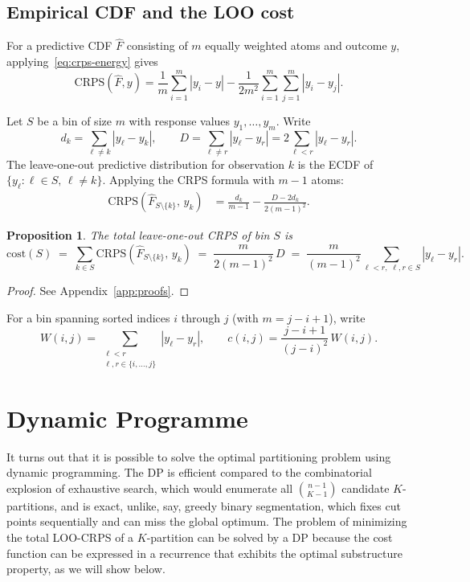 \documentclass[11pt]{article}
\newtheorem{proposition}{Proposition}
\begin{document}
\subsection*{Empirical CDF and the LOO cost}

For a predictive CDF $\hat{F}$ consisting of $m$ equally weighted atoms and outcome $y$,
applying~\eqref{eq:crps-energy} gives
\[
  \mathrm{CRPS}(\hat{F}, y)
  = \frac{1}{m}\sum_{i=1}^m |y_i - y|
    - \frac{1}{2m^2}\sum_{i=1}^m\sum_{j=1}^m |y_i - y_j|.
\]

Let $S$ be a bin of size $m$ with response values $y_1, \ldots, y_m$.
Write
\[
  d_k = \sum_{\ell \ne k} |y_\ell - y_k|,
  \qquad
  D = \sum_{\ell \ne r} |y_\ell - y_r| = 2\sum_{\ell < r}|y_\ell - y_r|.
\]
The leave-one-out predictive distribution for observation $k$ is the ECDF of
$\{y_\ell : \ell \in S,\, \ell \ne k\}$.
Applying the CRPS formula with $m - 1$ atoms:
\begin{align*}
  \mathrm{CRPS}(\hat{F}_{S\setminus\{k\}},\, y_k)
  &= \frac{d_k}{m-1}
     - \frac{D - 2d_k}{2(m-1)^2}.
\end{align*}

\begin{proposition}
\label{prop:cost}
The total leave-one-out CRPS of bin $S$ is
\[
  \mathrm{cost}(S)
  \;=\; \sum_{k \in S}\mathrm{CRPS}(\hat{F}_{S\setminus\{k\}},\, y_k)
  \;=\; \frac{m}{2(m-1)^2}\, D
  \;=\; \frac{m}{(m-1)^2} \sum_{\ell < r,\; \ell,r\in S} |y_\ell - y_r|.
\]
\end{proposition}

\begin{proof}
See Appendix~\ref{app:proofs}.
\end{proof}

For a bin spanning sorted indices $i$ through $j$ (with $m = j - i + 1$), write
\[
  W(i,j) = \sum_{\substack{\ell < r \\ \ell,r \in \{i,\ldots,j\}}} |y_\ell - y_r|,
  \qquad
  c(i,j) = \frac{j-i+1}{(j-i)^2}\, W(i,j).
\]

\section{Dynamic Programme}
\label{sec:dp}
It turns out that it is possible to solve the optimal partitioning problem using dynamic programming. 
The DP is efficient compared to the combinatorial explosion of exhaustive search, which would enumerate
all $\binom{n-1}{K-1}$ candidate $K$-partitions, and is exact, unlike, say, greedy binary segmentation, 
which fixes cut points sequentially and can miss the global optimum.
The problem of minimizing the total LOO-CRPS of a $K$-partition can be solved by a DP because the cost function
can be expressed in a recurrence that exhibits the optimal substructure property, as we will show below.
\end{document}

